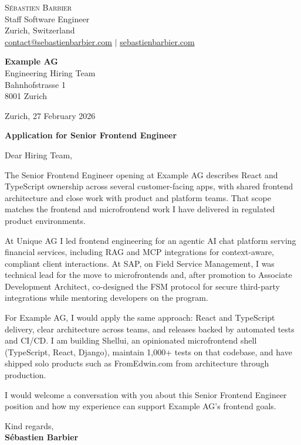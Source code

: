\documentclass[a4paper,11pt]{article}
\newcommand{\LetterDate}{27 February 2026}
\newcommand{\Company}{Example AG}
\newcommand{\Recipient}{Engineering Hiring Team}
\newcommand{\CompanyAddress}{Bahnhofstrasse 1}
\newcommand{\CompanyCity}{8001 Zurich}
\newcommand{\Role}{Senior Frontend Engineer}
\newcommand{\Greeting}{Dear Hiring Team,}
\newcommand{\JobAdHook}{React and TypeScript ownership across several customer-facing apps, with shared frontend architecture and close work with product and platform teams}
\begin{document}
{\LARGE\scshape Sébastien Barbier}\\[3pt]
{\small Staff Software Engineer}\\[6pt]
{\small Zurich, Switzerland\\
\href{mailto:contact@sebastienbarbier.com}{contact@sebastienbarbier.com} $|$ \href{https://sebastienbarbier.com}{sebastienbarbier.com}}

\vspace{14pt}
\textbf{\Company}\\
\Recipient\\
\CompanyAddress\\
\CompanyCity

\vspace{4pt}
\hfill Zurich, \LetterDate

\vspace{6pt}
\textbf{Application for \Role}

\vspace{4pt}
\Greeting

The \Role{} opening at \Company{} describes \JobAdHook{}. That scope matches the frontend and microfrontend work I have delivered in regulated product environments.

At Unique AG I led frontend engineering for an agentic AI chat platform serving financial services, including RAG and MCP integrations for context-aware, compliant client interactions. At SAP, on Field Service Management, I was technical lead for the move to microfrontends and, after promotion to Associate Development Architect, co-designed the FSM protocol for secure third-party integrations while mentoring developers on the program.

For \Company{}, I would apply the same approach: React and TypeScript delivery, clear architecture across teams, and releases backed by automated tests and CI/CD. I am building Shellui, an opinionated microfrontend shell (TypeScript, React, Django), maintain 1,000+ tests on that codebase, and have shipped solo products such as FromEdwin.com from architecture through production.

I would welcome a conversation with you about this \Role{} position and how my experience can support \Company{}'s frontend goals.

\vspace{4pt}
Kind regards,\\[20pt]
\textbf{Sébastien Barbier}
\end{document}
